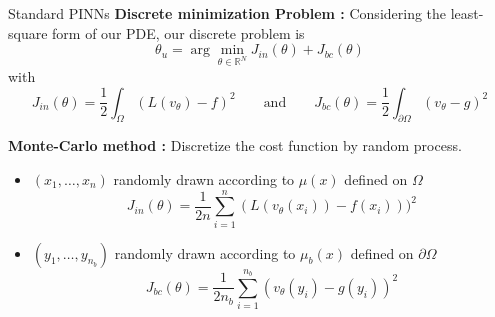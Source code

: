 \begin{frame}{Standard PINNs}
	\textbf{Discrete minimization Problem :} Considering the least-square form of our PDE, our discrete problem is
	\begin{equation}
		\theta_u=\arg\min_{\theta\in\mathbb{R}^N} J_{in}(\theta)+J_{bc}(\theta) \label{minpb_pinns}
	\end{equation}
	with 
	\begin{equation*}
		J_{in}(\theta)=\frac{1}{2}\int_\Omega (L(v_\theta) - f)^2  \qquad \text{and} \qquad J_{bc}(\theta)=\frac{1}{2}\int_{\partial\Omega} (v_\theta-g)^2
	\end{equation*}	
	
	\textbf{Monte-Carlo method :} Discretize the cost function by random process.
	
	\begin{itemize}[\textbullet]
		\item $(x_1,\dots,x_n)$ randomly drawn according to $\mu(x)$ defined on $\Omega$ 
		\begin{equation*}
			J_{in}(\theta)=\frac{1}{2n}\sum_{i=1}^n (L(v_\theta(x_i)) - f(x_i)))^2
		\end{equation*}
		\item $(y_1,\dots,y_{n_b})$ randomly drawn according to $\mu_b(x)$ defined on $\partial\Omega$
		\begin{equation*}
			J_{bc}(\theta)=\frac{1}{2n_b}\sum_{i=1}^{n_b} (v_\theta(y_i)-g(y_i))^2
		\end{equation*}
	\end{itemize}	
\end{frame}

